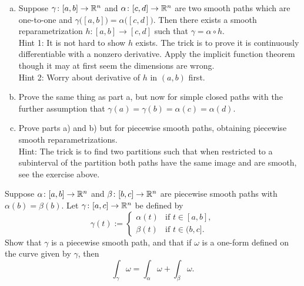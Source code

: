 \begin{exercise}
\leavevmode
\begin{enumerate}[a)]
\item
Suppose $\gamma \colon [a,b] \to {\mathbb{R}}^n$ and $\alpha \colon [c,d] \to {\mathbb{R}}^n$
are two smooth paths which are one-to-one and
$\gamma\bigl([a,b]\bigr) = \alpha\bigl([c,d]\bigr)$.  Then
there exists a smooth reparametrization $h \colon [a,b] \to [c,d]$
such that $\gamma = \alpha \circ h$.\\
Hint 1: It is not hard to show $h$ exists.
The trick is to prove it is continuously differentiable
with a nonzero derivative.  Apply the implicit function
theorem though it may at first seem the dimensions are wrong.\\
Hint 2: Worry about derivative of $h$ in $(a,b)$ first.
\item
Prove the same thing as part a, but now for simple closed paths with the
further assumption that $\gamma(a) = \gamma(b) = \alpha(c) = \alpha(d)$.
\item
Prove parts a) and b) but for piecewise smooth paths, obtaining
piecewise smooth reparametrizations.\\
Hint: The trick is to find two
partitions such that when restricted to a subinterval of the partition
both paths have the same image and are smooth, see the exercise above.
\end{enumerate}
\end{exercise}

\pagebreak[1]
\begin{exercise} 
Suppose $\alpha \colon [a,b] \to {\mathbb{R}}^n$ and
$\beta \colon [b,c] \to {\mathbb{R}}^n$ are piecewise smooth paths with
$\alpha(b)=\beta(b)$.  Let $\gamma \colon [a,c] \to {\mathbb{R}}^n$ be defined by
\begin{equation*}
\gamma(t) :=
\begin{cases}
\alpha(t) & \text{if } t \in [a,b], \\
\beta(t)  & \text{if } t \in (b,c].
\end{cases}
\end{equation*}
Show that $\gamma$ is a piecewise smooth path, and that if $\omega$ is a
one-form defined on the curve given by $\gamma$, then
\begin{equation*}
\int_{\gamma} \omega =
\int_{\alpha} \omega +
\int_{\beta} \omega .
\end{equation*}
\end{exercise}

